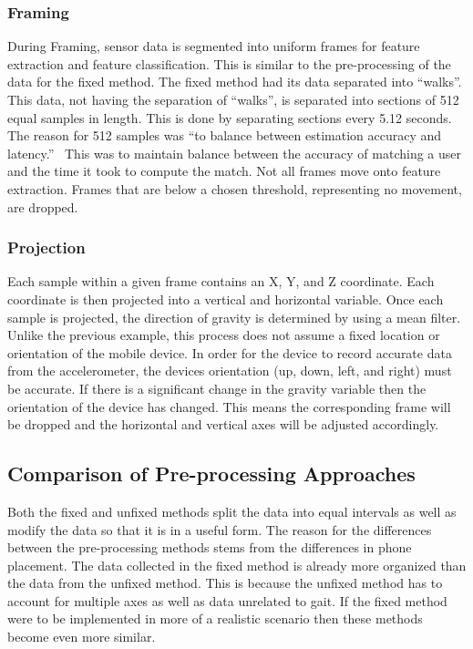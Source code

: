 \documentclass{sig-alternate}
\begin{document}
		
			
\subsubsection{Framing}{
 During Framing, sensor data is segmented into uniform frames for feature extraction and feature classification. This is similar to the pre-processing of the data for the fixed method. The fixed method had its data separated into ``walks''. This data, not having the separation of ``walks'', is separated into sections of 512 equal samples in length. This is done by separating sections every 5.12 seconds. The reason for 512 samples was ``to balance between estimation accuracy and latency.''~\cite{Muaaz:2013} This was to maintain balance between the accuracy of matching a user and the time it took to compute the match. Not all frames move onto feature extraction. Frames that are below a chosen threshold, representing no movement, are dropped. }
 			
\subsubsection{Projection}{
	Each sample within a given frame contains an X, Y, and Z coordinate. Each coordinate is then projected into a vertical and horizontal variable. Once each sample is projected, the direction of gravity is determined by using a mean filter. Unlike the previous example, this process does not assume a fixed location or orientation of the mobile device. In order for the device to record accurate data from the accelerometer, the devices orientation (up, down, left, and right) must be accurate. If there is a significant change in the gravity variable then the orientation of the device has changed. This means the corresponding frame will be dropped and the horizontal and vertical axes will be adjusted accordingly. 
}
\subsection{Comparison of Pre-processing Approaches}
	Both the fixed and unfixed methods split the data into equal intervals as well as modify the data so that it is in a useful form. The reason for the differences between the pre-processing methods stems from the differences in phone placement. The data collected in the fixed method is already more organized than the data from the unfixed method. This is because the unfixed method has to account for multiple axes as well as data unrelated to gait. If the fixed method were to be implemented in more of a realistic scenario then these methods become even more similar. 
\end{document}
